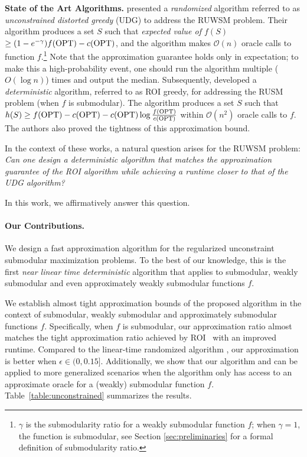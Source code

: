 \documentclass[10pt]{article} %
\theoremstyle{remark}
\newcommand{\OPT}{{\rm OPT}}
\begin{document}
\textbf{State of the Art Algorithms. }  \citet{harshaw2019submodular} presented a {\em randomized} algorithm referred to as \emph{unconstrained distorted greedy} (UDG) to address the RUWSM problem.  Their algorithm produces a set $S$ such that {\em expected value of $f(S)$} $\geq (1-e^{-\gamma})f(\OPT) - c(\OPT)$, and the algorithm makes $\mathcal{O}(n)$ oracle calls to function $f$.\footnote{$\gamma$ is the submodularity ratio for a weakly submodular function $f$; when $\gamma = 1$, the function is submodular, see  Section \ref{sec:preliminaries} for a formal definition of submodularity ratio. } Note that the approximation guarantee holds only in expectation; to make this a high-probability event, one should run the algorithm multiple ($O(\log n)$)  times and output the median.  Subsequently, \citet{jin2021unconstrained} developed a {\em deterministic} algorithm, referred to as ROI greedy, for addressing
the RUSM problem (when $f$ is submodular). The algorithm produces a set $S$ such that 
$h(S) \geq f(\OPT)-c(\OPT) - {c(\OPT)}\log \frac{f(\OPT)}{c(\OPT)}$ within $\mathcal{O}(n^2)$ oracle calls to $f$.  The authors also proved the tightness of this approximation bound. 

In the context of these works, a natural question arises for the RUWSM problem: {\em Can one design a deterministic algorithm that matches the approximation guarantee of the ROI algorithm while achieving a runtime closer to that of the UDG algorithm?} 

In this work, we affirmatively answer this question.

\paragraph{\bf Our Contributions.}

We design a fast approximation algorithm for the regularized unconstraint submodular maximization problems. To the best of our knowledge, this is the first {\em near linear time deterministic} algorithm that applies to submodular, weakly submodular and even approximately weakly submodular functions $f$. 

We establish almost tight approximation bounds of the proposed algorithm in the context of submodular, weakly submodular and approximately submodular functions $f$. Specifically, when $f$ is submodular, our approximation ratio almost matches the tight approximation ratio achieved by ROI~\cite{jin2021unconstrained} with an improved runtime. Compared to the linear-time randomized algorithm \cite{harshaw2019submodular}, our approximation is better when $\epsilon \in (0, 0.15]$. Additionally, we show that our algorithm and can be applied to more generalized scenarios when the algorithm only has access to an approximate oracle for a (weakly) submodular function $f$.  Table~\ref{table:unconstrained} summarizes the results.
\end{document}
